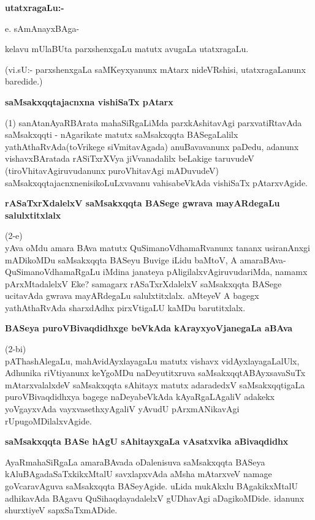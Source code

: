 {\bigskip
\noindent
{\large\bf utatxragaLu:-}}
\medskip

\noindent
e. sAmAnayxBAga-

kelavu mUlaBUta parxshenxgaLu matutx avugaLa utatxragaLu.

(vi.sU:- parxshenxgaLa saMKeyxyanunx mAtarx nideVRshisi, utatxragaLanunx baredide.)

{\bigskip
\noindent
{\large\bf saMsakxqqtajacnxna vishiSaTx pAtarx}}\label{page30a}
\medskip

\noindent
(1) sanAtanAyaRBArata mahaSiRgaLiMda parxkAshitavAgi parxvatiRtavAda saMsakxqqti - nAgarikate matutx \-saMsakxqqta BASegaLalilx yathAthaRvAda(toVrikege siVmita\-vAgada) anuBavavanunx paDedu, adanunx vishavx\-BAratada rASiTxrXVya jiVvanadalilx beLakige taruvudeV (tiroVhitavAgiruvudanunx puroVhitavAgi mADu\-vudeV) saMsakxqqtajacnxnenisikoLuLxvavanu vahisabeVkAda vishiSaTx pAtarxvAgide.

{\bigskip
\noindent
{\large\bf rASaTxrXdalelxV saMsakxqqta BASege gwrava mayARdegaLu salulxtitxlalx}}\label{page30b}
\medskip

\noindent
(2-e) \\yAva oMdu amara BAva matutx QuSimanoVdhamaRvanunx tananx usira\-nAnxgi mADi\-koMDu saMsakxqqta BASeyu Buvige iLidu baMtoV, A amaraBAva-\-QuSimanoVdhamaRgaLu iMdina jana\-teya pAligilalxvAgiruvudariMda, namamx pArxMtadalelxV Eke? samagarx rASaTxrXdalelxV saMsakxqqta BASege ucita\-vAda gwrava mayARdegaLu salulxtitxlalx. aMteyeV A bagegx yathAthaRvAda sharxdAdhx pirxVtigaLU kaMDu barutitxlalx.

{\bigskip
\noindent
{\large\bf BASeya puroVBivaqdidhxge beVkAda kArayxyoVjanegaLa aBAva}}\label{page31}
\medskip

\noindent
(2-bi) \\ pAThashAlegaLu, mahAvidAyxlayagaLu matutx vishavx vidAyxlayagaLalUlx, Adhunika riVtiyanunx keY\-goMDu naDeyutitxruva saMsakxqqtABAyxsavaSuTx mAtarxvalalxdeV saMsakxqqta sAhitayx matutx adaradedxV saMsakxqqti\-gaLa puroVBivaqdidhxya bagege naDeya\-beVkAda kAyaRgaLAgaliV adakekx yoVgayxvAda vayxvasethx\-yAgaliV yAvudU pArxmANikavAgi rUpugoMDilalxvAgide.

{\bigskip
\noindent
{\large\bf saMsakxqqta BASe hAgU sAhitayxgaLa vAsatxvika aBivaqdidhx}}\label{page31a}
\medskip

\noindent
AyaRmahaSiRgaLa amaraBAvada oDalenisuva saMsakxqqta BASeya kAluBAga\-daSaTx\-kikxMtalU savxlapx\-vAda aMsha mAtarxveV namage goVcaravAguva saMsakxqqta BASeyAgide. uLida mukAkxlu BAgakikxMtalU adhika\-vAda BAgavu QuSihaqdayadalelxV gUDha\-vAgi aDagikoMDide. idanunx shurxtiyeV sapxSaTxmADide.

